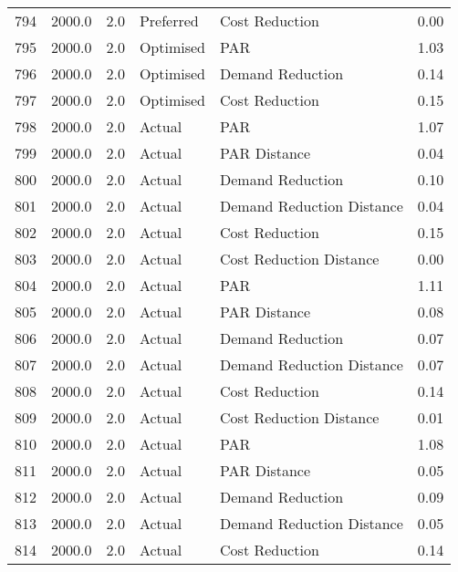\begin{longtable}{lrrllr}
794  &       2000.0 &     2.0 &      Preferred &             Cost Reduction &   0.00 \\
795  &       2000.0 &     2.0 &      Optimised &                        PAR &   1.03 \\
796  &       2000.0 &     2.0 &      Optimised &           Demand Reduction &   0.14 \\
797  &       2000.0 &     2.0 &      Optimised &             Cost Reduction &   0.15 \\
798  &       2000.0 &     2.0 &         Actual &                        PAR &   1.07 \\
799  &       2000.0 &     2.0 &         Actual &               PAR Distance &   0.04 \\
800  &       2000.0 &     2.0 &         Actual &           Demand Reduction &   0.10 \\
801  &       2000.0 &     2.0 &         Actual &  Demand Reduction Distance &   0.04 \\
802  &       2000.0 &     2.0 &         Actual &             Cost Reduction &   0.15 \\
803  &       2000.0 &     2.0 &         Actual &    Cost Reduction Distance &   0.00 \\
804  &       2000.0 &     2.0 &         Actual &                        PAR &   1.11 \\
805  &       2000.0 &     2.0 &         Actual &               PAR Distance &   0.08 \\
806  &       2000.0 &     2.0 &         Actual &           Demand Reduction &   0.07 \\
807  &       2000.0 &     2.0 &         Actual &  Demand Reduction Distance &   0.07 \\
808  &       2000.0 &     2.0 &         Actual &             Cost Reduction &   0.14 \\
809  &       2000.0 &     2.0 &         Actual &    Cost Reduction Distance &   0.01 \\
810  &       2000.0 &     2.0 &         Actual &                        PAR &   1.08 \\
811  &       2000.0 &     2.0 &         Actual &               PAR Distance &   0.05 \\
812  &       2000.0 &     2.0 &         Actual &           Demand Reduction &   0.09 \\
813  &       2000.0 &     2.0 &         Actual &  Demand Reduction Distance &   0.05 \\
814  &       2000.0 &     2.0 &         Actual &             Cost Reduction &   0.14 \\

\end{longtable}
